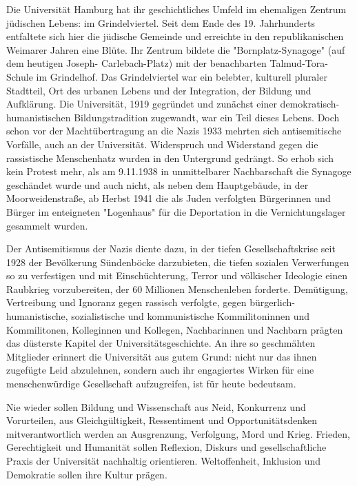 \documentclass[ngerman,headheight=70pt]{scrartcl}
\begin{document}
    Die Universität Hamburg hat ihr geschichtliches Umfeld im ehemaligen Zentrum
    jüdischen Lebens: im Grindelviertel. Seit dem Ende des 19. Jahrhunderts
    entfaltete sich hier die jüdische Gemeinde und erreichte in den
    republikanischen Weimarer Jahren eine Blüte. Ihr Zentrum bildete die
    "Bornplatz-Synagoge" (auf dem heutigen Joseph- Carlebach-Platz) mit der
    benachbarten Talmud-Tora-Schule im Grindelhof. Das Grindelviertel war ein
    belebter, kulturell pluraler Stadtteil, Ort des urbanen Lebens und der
    Integration, der Bildung und Aufklärung. Die Universität, 1919 gegründet
    und zunächst einer demokratisch-humanistischen Bildungstradition zugewandt,
    war ein Teil dieses Lebens. Doch schon vor der Machtübertragung an die Nazis
    1933 mehrten sich antisemitische Vorfälle, auch an der Universität. Widerspruch
    und Widerstand gegen die rassistische Menschenhatz wurden in den Untergrund
    gedrängt. So erhob sich kein Protest mehr, als am 9.11.1938 in unmittelbarer
    Nachbarschaft die Synagoge geschändet wurde und auch nicht, als neben dem
    Hauptgebäude, in der Moorweidenstraße, ab Herbst 1941 die als Juden verfolgten
    Bürgerinnen und Bürger im enteigneten "Logenhaus" für die Deportation in die
    Vernichtungslager gesammelt wurden.

    Der Antisemitismus der Nazis diente dazu, in der tiefen Gesellschaftskrise
    seit 1928 der Bevölkerung Sündenböcke darzubieten, die tiefen sozialen
    Verwerfungen so zu verfestigen und mit Einschüchterung, Terror und völkischer
    Ideologie einen Raubkrieg vorzubereiten, der 60 Millionen Menschenleben
    forderte. Demütigung, Vertreibung und Ignoranz gegen rassisch verfolgte,
    gegen bürgerlich-humanistische, sozialistische und kommunistische
    Kommilitoninnen und Kommilitonen, Kolleginnen und Kollegen, Nachbarinnen
    und Nachbarn prägten das düsterste Kapitel der Universitätsgeschichte. An
    ihre so geschmähten Mitglieder erinnert die Universität aus gutem Grund:
    nicht nur das ihnen zugefügte Leid abzulehnen, sondern auch ihr engagiertes
    Wirken für eine menschenwürdige Gesellschaft aufzugreifen, ist für heute
    bedeutsam.

    Nie wieder sollen Bildung und Wissenschaft aus Neid, Konkurrenz und
    Vorurteilen, aus Gleichgültigkeit, Ressentiment und Opportunitätsdenken
    mitverantwortlich werden an Ausgrenzung, Verfolgung, Mord und Krieg. Frieden,
    Gerechtigkeit und Humanität sollen Reflexion, Diskurs und gesellschaftliche
    Praxis der Universität nachhaltig orientieren. Weltoffenheit, Inklusion und
    Demokratie sollen ihre Kultur prägen.
\end{document}
